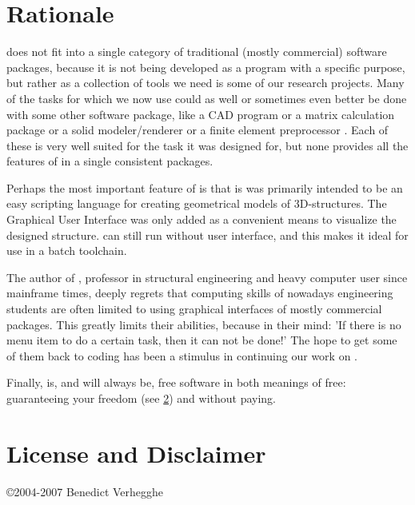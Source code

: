 \section{Rationale}
\label{sec:rationale}
\pyformex does not fit into a single category of traditional (mostly commercial) software packages, because it is not being developed as a program with a specific purpose, but rather as a collection of tools we need is some of our research projects. Many of the tasks for which we now use \pyformex could as well or sometimes even better be done with some other software package, like a CAD program %
or a %
matrix calculation package or a solid modeler/renderer %
or a finite element preprocessor%
. Each of these is very well suited for the task it was designed for, but none provides all the features of \pyformex in a single consistent packages. 

Perhaps the most important feature of \pyformex is that is was primarily intended to be an easy scripting language for creating geometrical models of 3D-structures. The Graphical User Interface was only added as a convenient means to visualize the designed structure. \pyformex can still run without user interface, and this makes it ideal for use in a batch toolchain.

The author of \pyformex, professor in structural engineering and heavy computer user since mainframe times, deeply regrets that computing skills of nowadays engineering students are often limited to using graphical interfaces of mostly commercial packages. This greatly limits their abilities, because in their mind: 'If there is no menu item to do a certain task, then it can not be done!'
The hope to get some of them back to coding has been a stimulus in continuing our work on \pyformex. 
 
Finally, \pyformex is, and will always be, free software in both meanings of free: guaranteeing your freedom (see \ref{sec:license}) and without paying. 



\section{License and Disclaimer}
\label{sec:license}
\pyformex \copyright 2004-2007 Benedict Verhegghe

